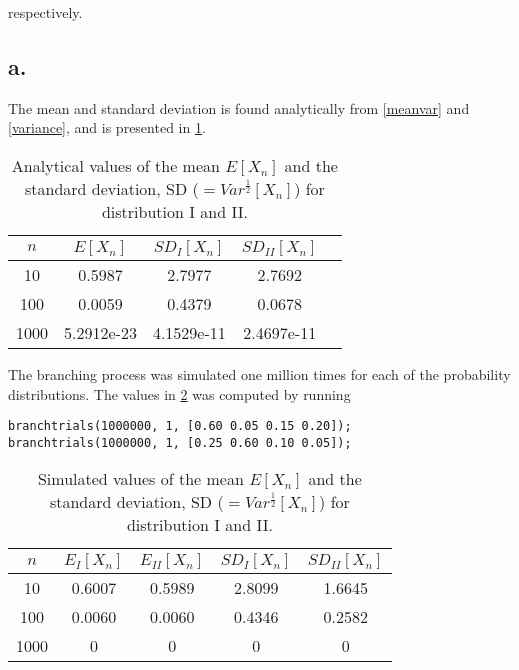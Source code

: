 respectively. 

\subsection*{a.}

The mean and standard deviation is found analytically from \cref{meanvar} and \cref{variance}, and is presented in \cref{anatable}.

\begin{table}[!htbp]
\centering
\begin{tabular}{ccccc}
  \hline
  \noalign{\smallskip}
  $n$ & $E[X_n]$ & $SD_I[X_n]$ & $SD_{II}[X_n]$   \\
  \hline
  \noalign{\smallskip}
  10   & 0.5987 & 2.7977 & 2.7692 &    \\
  100  & 0.0059 & 0.4379 & 0.0678 &    \\
  1000 & 5.2912e-23 & 4.1529e-11 & 2.4697e-11 &    \\
  \hline
\end{tabular}
\caption{Analytical values of the mean $E[X_n]$ and the standard deviation, SD ($=Var^{\frac{1}{2}}[X_n]$) for distribution I and II.}
\label{anatable}
\end{table}


The branching process was simulated one million times for each of the probability distributions. The values in \cref{simtable} was computed by running

\begin{verbatim}
branchtrials(1000000, 1, [0.60 0.05 0.15 0.20]);
branchtrials(1000000, 1, [0.25 0.60 0.10 0.05]);
\end{verbatim}


\begin{table}[!htbp]
\centering
\begin{tabular}{ccccc}
  \hline
  \noalign{\smallskip}
  $n$ & $E_I[X_n]$ &$E_{II}[X_n]$ & $SD_I[X_n]$ & $SD_{II}[X_n]$   \\
  \hline
  \noalign{\smallskip}
  10   & 0.6007 & 0.5989 & 2.8099 & 1.6645     \\
  100  & 0.0060 & 0.0060 & 0.4346 & 0.2582     \\
  1000 & 0 & 0 & 0 & 0    \\
  \hline
\end{tabular}
\caption{Simulated values of the mean $E[X_n]$ and the standard deviation, SD ($=Var^{\frac{1}{2}}[X_n]$) for distribution I and II.}
\label{simtable}
\end{table}

